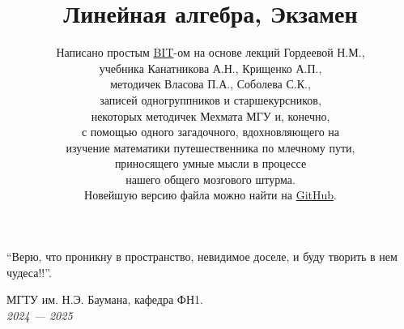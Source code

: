 \documentclass[a4papper]{article}
\title{\Huge Линейная алгебра, Экзамен}
\author{
    Написано простым \href{https://t.me/BorislavTimoshin}{BIT}-ом на основе лекций Гордеевой Н.М., \\ 
    учебника Канатникова А.Н., Крищенко А.П., \\
    методичек Власова П.А., Соболева С.К., \\
    записей одногруппников и старшекурсников,\\ некоторых методичек Мехмата МГУ и, конечно, \\ 
    с помощью одного загадочного, вдохновляющего на \\ 
    изучение математики путешественника по млечному пути, \\
    приносящего умные мысли в процессе \\
    нашего общего мозгового штурма. \\
    Новейшую версию файла можно найти на \href{https://github.com/BMSTU-HIGH-MATH/Linear-Algebra-Exam}{GitHub}.
}
\date{} %
\begin{document}
    \pagestyle{fancy}
    \fancyhead[L]{\thepage}

    \maketitle

    \epigraph{
        ``Верю, что проникну в пространство, невидимое доселе, и буду творить в нем чудеса!!''.
    }{}


    \vfill %

    \begin{center}
        \Large МГТУ им. Н.Э. Баумана, кафедра ФН1. \\
        \emph{2024 — 2025}
    \end{center}

    \newpage
        
    \tableofcontents
    
    
\end{document}
